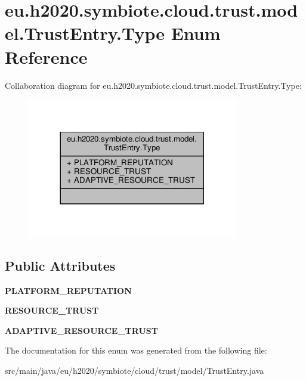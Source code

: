 \hypertarget{enumeu_1_1h2020_1_1symbiote_1_1cloud_1_1trust_1_1model_1_1TrustEntry_1_1Type}{}\section{eu.\+h2020.\+symbiote.\+cloud.\+trust.\+model.\+Trust\+Entry.\+Type Enum Reference}
\label{enumeu_1_1h2020_1_1symbiote_1_1cloud_1_1trust_1_1model_1_1TrustEntry_1_1Type}


Collaboration diagram for eu.\+h2020.\+symbiote.\+cloud.\+trust.\+model.\+Trust\+Entry.\+Type\+:
\nopagebreak
\begin{figure}[H]
\begin{center}
\leavevmode
\includegraphics[width=260pt]{enumeu_1_1h2020_1_1symbiote_1_1cloud_1_1trust_1_1model_1_1TrustEntry_1_1Type__coll__graph}
\end{center}
\end{figure}
\subsection*{Public Attributes}
\begin{DoxyCompactItemize}
\item 
\mbox{\label{enumeu_1_1h2020_1_1symbiote_1_1cloud_1_1trust_1_1model_1_1TrustEntry_1_1Type_ab6714233e833e96190697f144b5d200f}} 
{\bfseries P\+L\+A\+T\+F\+O\+R\+M\+\_\+\+R\+E\+P\+U\+T\+A\+T\+I\+ON}
\item 
\mbox{\label{enumeu_1_1h2020_1_1symbiote_1_1cloud_1_1trust_1_1model_1_1TrustEntry_1_1Type_a290c9ed4f9655b404b0cc00e2bd5becd}} 
{\bfseries R\+E\+S\+O\+U\+R\+C\+E\+\_\+\+T\+R\+U\+ST}
\item 
\mbox{\label{enumeu_1_1h2020_1_1symbiote_1_1cloud_1_1trust_1_1model_1_1TrustEntry_1_1Type_a9e004d1e97acbd1e5cffe19abad391ec}} 
{\bfseries A\+D\+A\+P\+T\+I\+V\+E\+\_\+\+R\+E\+S\+O\+U\+R\+C\+E\+\_\+\+T\+R\+U\+ST}
\end{DoxyCompactItemize}


The documentation for this enum was generated from the following file\+:\begin{DoxyCompactItemize}
\item 
src/main/java/eu/h2020/symbiote/cloud/trust/model/Trust\+Entry.\+java\end{DoxyCompactItemize}
